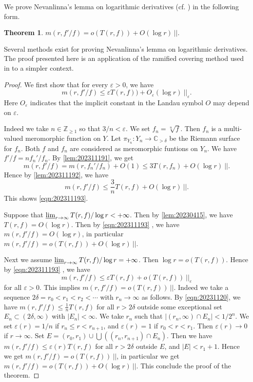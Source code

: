\documentclass[11pt,english]{smfart}
\theoremstyle{plain}
\newtheorem{thm}{Theorem}[section]
\theoremstyle{definition}
\theoremstyle{remark}
\numberwithin{equation}{section}
\theoremstyle{plain}
\def\ep{\varepsilon}
\begin{document}
	We prove Nevanlinna's lemma on logarithmic derivatives (cf. \cite[Lemma 1.2.2]{NW13}) in the following form.
	
	\begin{thm}\label{thm:20231119}
		$m(r,f'/f)=o(T(r,f))+O(\log r)\ ||.
		$
	\end{thm}
	
	Several methods exist for proving Nevanlinna's lemma on logarithmic derivatives. 
	The proof presented here is an application of the ramified covering method used in \cite[Thm 4.8]{yamanoi2015kobayashi} to a simpler context.
	
	
	\begin{proof}
		We first show that for every $\varepsilon>0$, we have
		\begin{equation}\label{eqn:202311193}
			m(r,f'/f)\leq \varepsilon T(r,f))+O_{\varepsilon}(\log r)\ ||_{\varepsilon}.
		\end{equation}
		Here $O_{\varepsilon}$ indicates that the implicit constant in the Landau symbol $O$ may depend on $\varepsilon$.
		
		Indeed we take $n\in\mathbb Z_{\geq 1}$ so that $3/n<\varepsilon$.
		We set $f_n=\sqrt[n]{f}$.
		Then $f_n$ is a multi-valued meromorphic function on $Y$.
		Let $\pi_{Y_n}:Y_n\to \mathbb C_{>\delta}$ be the Riemann surface for $f_n$.
		Both $f$ and $f_n$ are considered as meromorphic funtions on $Y_n$.
		We have $f'/f=nf_n'/f_n$.
		By \cref{lem:202311191}, we get
		$$
		m(r, f'/f)= m(r,f_n'/f_n )+O(1)\leq 3T(r,f_n)+O(\log r)\ ||. 
		$$
		Hence by \cref{lem:202311192}, we have 
		$$
		m(r, f'/f)\leq \frac{3}{n}T(r,f)+O(\log r)\ ||. 
		$$
		This shows \eqref{eqn:202311193}.
		
		Suppose that $\varliminf_{r\to\infty}T(r,f)/\log r<+\infty$.
		Then by \cref{lem:20230415}, we have $T(r,f)=O(\log r)$.
		Then by \eqref{eqn:202311193}	, we have $m(r, f'/f)			=O(\log r)$, in particular $m(r,f'/f)=o(T(r,f))+O(\log r)\ ||$.
		
		Next we assume $\varliminf_{r\to\infty}T(r,f)/\log r=+\infty$.
		Then $\log r=o(T(r,f))$.		
		Hence by \eqref{eqn:202311193}	, we have 
		\begin{equation}\label{eqn:20231120}
			m(r, f'/f)			\leq \ep T(r, f)+	o(T(r,f))\ ||_{\varepsilon}
		\end{equation}
		for all $\varepsilon>0$.
		This implies $m(r, f'/f)=o(T(r,f))\ ||$.
		Indeed we take a sequence $2\delta=r_0<r_1<r_2<\cdots$ with $r_n\to\infty$ as follows.
		By \eqref{eqn:20231120}, we have	$m(r, f'/f)\leq \frac{1}{n}T(r,f)$ for all $r>2\delta$ outside some exceptional set $E_n\subset (2\delta,\infty)$ with $|E_n|<\infty$.
		We take $r_n$ such that $|(r_n,\infty)\cap E_n|<1/2^n$.
		We set $\varepsilon(r)=1/n$ if $r_n\leq r<r_{n+1}$, and $\varepsilon(r)=1$ if $r_0<r<r_1$.
		Then $\varepsilon(r)\to0$ if $r\to\infty$.
		Set $E=(r_0,r_1)\cup\bigcup\left((r_n,r_{n+1})\cap E_n\right)$.
		Then we have $m(r, f'/f)\leq \varepsilon(r)T(r,f)$ for all $r>2\delta$ outside $E$, and $|E|<r_1+1$.
		Hence we get $m(r, f'/f)=o(T(r,f))\ ||$, in particular we get $m(r,f'/f)=o(T(r,f))+O(\log r)\ ||$.
		This conclude the proof of the theorem.	
	\end{proof}
	
\end{document}
